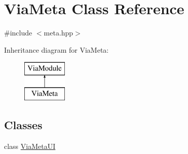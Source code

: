 \hypertarget{class_via_meta}{}\section{Via\+Meta Class Reference}
\label{class_via_meta}


{\ttfamily \#include $<$meta.\+hpp$>$}

Inheritance diagram for Via\+Meta\+:\begin{figure}[H]
\begin{center}
\leavevmode
\includegraphics[height=2.000000cm]{class_via_meta}
\end{center}
\end{figure}
\subsection*{Classes}
\begin{DoxyCompactItemize}
\item 
class \mbox{\hyperlink{class_via_meta_1_1_via_meta_u_i}{Via\+Meta\+UI}}
\end{DoxyCompactItemize}

